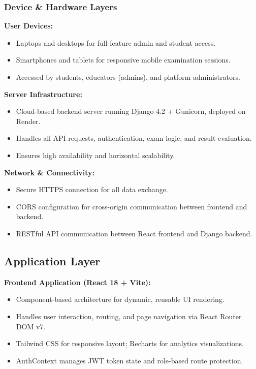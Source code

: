 \documentclass[12pt,a4paper]{article}
\begin{document}
\subsubsection{Device \& Hardware Layers}

\textbf{User Devices:}
\begin{itemize}[leftmargin=1.5em]
  \item Laptops and desktops for full-feature admin and student access.
  \item Smartphones and tablets for responsive mobile examination sessions.
  \item Accessed by students, educators (admins), and platform administrators.
\end{itemize}

\textbf{Server Infrastructure:}
\begin{itemize}[leftmargin=1.5em]
  \item Cloud-based backend server running Django 4.2 + Gunicorn, deployed on Render.
  \item Handles all API requests, authentication, exam logic, and result evaluation.
  \item Ensures high availability and horizontal scalability.
\end{itemize}

\textbf{Network \& Connectivity:}
\begin{itemize}[leftmargin=1.5em]
  \item Secure HTTPS connection for all data exchange.
  \item CORS configuration for cross-origin communication between frontend and backend.
  \item RESTful API communication between React frontend and Django backend.
\end{itemize}

\subsection{Application Layer}

\textbf{Frontend Application (React 18 + Vite):}
\begin{itemize}[leftmargin=1.5em]
  \item Component-based architecture for dynamic, reusable UI rendering.
  \item Handles user interaction, routing, and page navigation via React Router DOM v7.
  \item Tailwind CSS for responsive layout; Recharts for analytics visualizations.
  \item AuthContext manages JWT token state and role-based route protection.
\end{itemize}
\end{document}
